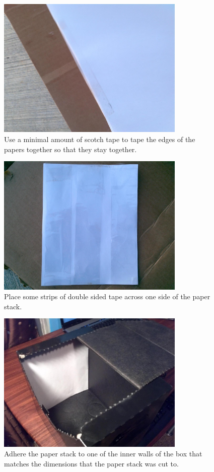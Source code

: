 \documentclass[13pt]{article}
\begin{document}
\begin{figure}[ht!]
\centering
\includegraphics[width=0.8\textwidth]{eps/layersTaped.eps}
\caption{Use a minimal amount of scotch tape to tape the edges of the papers together so that they stay together.}
\end{figure}

\begin{figure}[ht!]
\centering
\includegraphics[width=0.8\textwidth]{eps/doubleSided.eps}
\caption{Place some strips of double sided tape across one side of the paper stack.}
\end{figure}

\begin{figure}[ht!]
\centering
\includegraphics[width=0.8\textwidth]{eps/tapedIn.eps}
\caption{Adhere the paper stack to one of the inner walls of the box that matches the dimensions that the paper stack was cut to.}
\end{figure}
\end{document}
